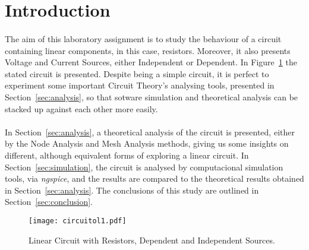 \section{Introduction}
\label{sec:introduction}

\paragraph{}The aim of this laboratory assignment is to study the behaviour of a circuit containing linear components, in this case, resistors. Moreover, it also presents Voltage and Current Sources, either Independent or Dependent. In Figure~\ref{fig:circuitol1} the stated circuit is presented.
Despite being a simple circuit, it is perfect to experiment some important Circuit Theory's analysing tools, presented in Section~\ref{sec:analysis}, so that sotware simulation and theoretical analysis can be stacked up against each other more easily.

\paragraph{}In Section~\ref{sec:analysis}, a theoretical analysis of the circuit is
presented, either by the Node Analysis %
and Mesh Analysis %
methods, giving us some insights on different, although equivalent forms of exploring a linear circuit. In Section~\ref{sec:simulation}, the circuit is analysed by computacional simulation tools, via \textit{ngspice}, and the results are compared to the theoretical results obtained in Section~\ref{sec:analysis}. The conclusions of this study are outlined in Section~\ref{sec:conclusion}.

\begin{figure}[h] \centering
\texttt{[image: circuitol1.pdf]}
\caption{Linear Circuit with Resistors, Dependent and Independent Sources.}
\label{fig:circuitol1}
\end{figure}

